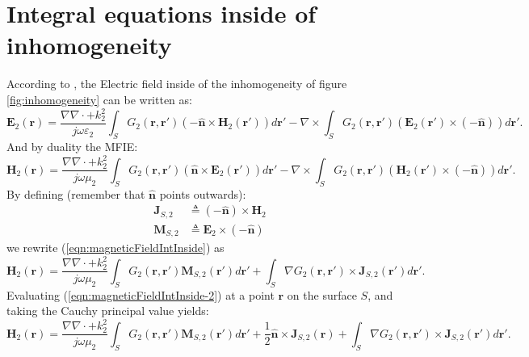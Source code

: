 \documentclass[a4paper,10pt]{book}
\newcommand{\field}[1]{\mathbf{#1}}
\newcommand{\current}[1]{\mathbf{#1}}
\newcommand{\vect}[1]{\mathbf{#1}}
\begin{document}
\section{Integral equations inside of inhomogeneity}
%
\par
According to \cite{Ides2006}, the Electric field inside of the inhomogeneity of figure \ref{fig:inhomogeneity} can be written as:
\begin{equation}\label{eqn:electricFieldIntInside}
\field{E}_2\left(\vect{r}\right) = \frac{\nabla \nabla \cdot + k_2^2}{j \omega \varepsilon_2} \int_S G_2(\vect{r}, \vect{r}') \left(-\vect{\hat{n}} \times \field{H}_2\left(\vect{r}'\right) \right) d\vect{r}' - \nabla \times \int_S G_2(\vect{r}, \vect{r}') \left( \field{E}_2\left(\vect{r}'\right) \times \left(-\vect{\hat{n}} \right)\right) d\vect{r}'.
\end{equation}
And by duality the MFIE:
\begin{equation}\label{eqn:magneticFieldIntInside}
\field{H}_2\left(\vect{r}\right) = \frac{\nabla \nabla \cdot + k_2^2}{j \omega \mu_2} \int_S G_2(\vect{r}, \vect{r}') \left(\vect{\hat{n}} \times \field{E}_2\left(\vect{r}'\right) \right) d\vect{r}' - \nabla \times \int_S G_2(\vect{r}, \vect{r}') \left( \field{H}_2\left(\vect{r}'\right) \times \left(-\vect{\hat{n}} \right)\right) d\vect{r}'.
\end{equation}
By defining (remember that $\vect{\hat{n}}$ points outwards):
\begin{align}
\current{J}_{S,2} &\triangleq (-\vect{\hat{n}}) \times \field{H}_2 \\
\current{M}_{S,2} &\triangleq \field{E}_2 \times (-\vect{\hat{n}}) 
\end{align}
we rewrite (\ref{eqn:magneticFieldIntInside}) as 
\begin{equation}\label{eqn:magneticFieldIntInside-2}
\field{H}_2\left(\vect{r}\right) = \frac{\nabla \nabla \cdot + k_2^2}{j \omega \mu_2} \int_S G_2(\vect{r}, \vect{r}') \current{M}_{S,2}\left(\vect{r}'\right) d\vect{r}' + \int_S \nabla G_2(\vect{r}, \vect{r}') \times \current{J}_{S,2}\left(\vect{r}'\right) d\vect{r}'.
\end{equation}
Evaluating (\ref{eqn:magneticFieldIntInside-2}) at a point $\vect{r}$ on the surface $S$, and taking the Cauchy principal value \cite{Arnoldus2011} yields:
\begin{equation}\label{eqn:magneticFieldIntInside-3}
\field{H}_2\left(\vect{r}\right) = \frac{\nabla \nabla \cdot + k_2^2}{j \omega \mu_2} \int_S G_2(\vect{r}, \vect{r}') \current{M}_{S,2}\left(\vect{r}'\right) d\vect{r}' + \frac{1}{2} \vect{\hat{n}} \times \current{J}_{S,2}\left(\vect{r}\right) +  \int_S \nabla G_2(\vect{r}, \vect{r}') \times \current{J}_{S,2}\left(\vect{r}'\right) d\vect{r}'.
\end{equation}
\end{document}
